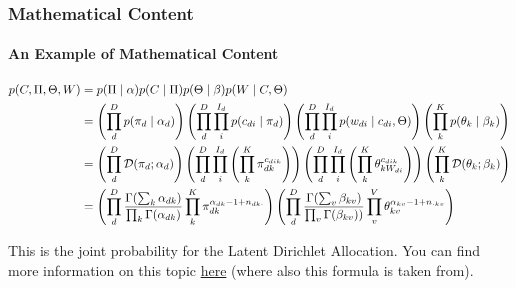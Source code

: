 	\begin{frame}
		\frametitle{Mathematical Content}
		\framesubtitle{An Example of Mathematical Content}

		\small
		\begin{align*}
            p(C, \Pi, \Theta, W) &= p( \Pi \mid \alpha) p(C \mid \Pi) p(\Theta \mid \beta) p(W \mid C, \Theta)\\
            &=
            \left(
            \prod_d^D p(\pi_d \mid \alpha_d)
            \right)
            \left(
            \prod_d^D
            \prod_i^{I_d} p(c_{di} \mid \pi_d)
            \right)
            \left(
            \prod_d^D
            \prod_i^{I_d} p(w_{di} \mid c_{di},\Theta)
            \right)
            \left(
            \prod_k^K
            p(\theta_k \mid \beta_k)
            \right)\\
            &=
            \left(
            \prod_d^D
            {\mathcal D}(\pi_d; \alpha_d)
            \right)
            \left(
            \prod_d^D
            \prod_i^{I_d}
            \left(
            \prod_k^K \pi_{dk}^{c_{dik}}
            \right)
            \right)
            \left(
            \prod_d^D
            \prod_i^{I_d}
            \left(
            \prod_k^K \theta_{kW_{di}}^{c_{dik}}
            \right)
            \right)
            \left(
            \prod_k^K
            {\mathcal D} (\theta_k; \beta_k)
            \right)\\
            &=
            \left(
            \prod_d^D
            \frac{\Gamma (\sum_k \alpha_{dk})}{\prod_k \Gamma(\alpha_{dk})}
            \prod_k^K \pi_{dk}^{\alpha_{dk}-1+n_{dk\cdot}}
            \right)
            \left(
            \prod_d^D
            \frac{\Gamma (\sum_v \beta_{kv})}{\prod_v \Gamma(\beta_{kv}))}
            \prod_v^V \theta_{kv}^{\alpha_{kv}-1+n_{\cdot kv}}
            \right)
        \end{align*}

        This is the joint probability for the Latent Dirichlet Allocation. You can find more information on this topic \hyperlink{https://www.youtube.com/watch?v=o22cA1DhSMQ&list=PL05umP7R6ij1tHaOFY96m5uX3J21a6yNd&index=22&t=0s}{here} (where also this formula is taken from).
	\end{frame}
